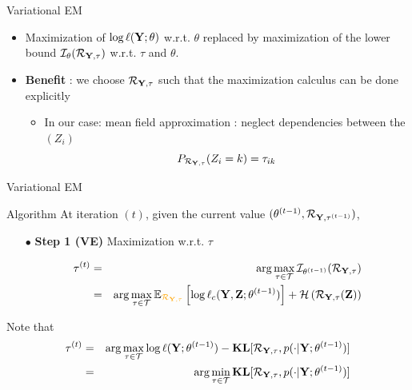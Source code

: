 \documentclass[compress,10pt]{beamer}
\begin{document}
 \begin{frame}{Variational EM }
 

\begin{itemize}
\item Maximization of  $\log \ell(\mathbf{Y} ; \theta)$  w.r.t.  $\theta$ replaced by maximization of the lower bound $\mathcal{I}_{\theta}(\mathcal{R}_{\mathbf{Y},\mathbf{\tau}}) $  w.r.t.  $\tau$ and $\theta$. 
\item \textbf{Benefit} : we choose   $\mathcal{R}_{\mathbf{Y},\mathbf{\tau}}$  such that the maximization calculus can be done explicitly
 \begin{itemize}
 \item In our case: mean field approximation : neglect dependencies between the  $(Z_i)$ 
 $$P_{\mathcal{R}_{\mathbf{Y},\mathbf{\tau}}}(Z_i=k) = \tau_{ik}$$
  \end{itemize}



 \end{itemize}
  \end{frame}
\begin{frame}{Variational  EM}

\begin{block}{Algorithm}
 \noindent At iteration $(t)$, given the current value  $(\theta^{(t-1)},\mathcal{R}_{\mathbf{Y}, \mathbf{\tau}^{(t-1)}})$,
\begin{enumerate}
\item[$\bullet$]\textbf{Step 1 (VE)} Maximization w.r.t. $\tau$

\begin{eqnarray*}
\btau^{(t)}  &=&  \arg \max_{\btau  \in \mathcal{T}}  \mathcal{I}_{\theta^{(t-1)}}(\mathcal{R}_{\Xall,\btau})\\
 &=&  \arg \max_{\btau  \in \mathcal{T}}   \mathbb{E}_{\color{dgreen}\mathcal{R}_{\Xall,\btau}} \left[\log \ell_c(\bX,\bZ;  \theta^{(t-1)})   \right] +  \mathcal{H}\left(\mathcal{R}_{\Xall,\btau}(\bZ)\right) 
 \end{eqnarray*}
 \end{enumerate}
 \end{block} 
 
Note that 
\begin{eqnarray*}
\mathbf{\tau}^{(t)}  &=&  \arg \max_{\mathbf{\tau}  \in \mathcal{T}}  \log \ell(\mathbf{Y} ; \theta^{(t-1)})  -  \mathbf{KL}[\mathcal{R}_{\mathbf{Y}, \mathbf{\tau}}, p(\cdot | \mathbf{Y}; \theta^{(t-1)})]\\ 
&=& \arg \min_{\mathbf{\tau}  \in \mathcal{T}}\mathbf{KL}[\mathcal{R}_{\mathbf{Y}, \mathbf{\tau}}, p(\cdot | \mathbf{Y}; \theta^{(t-1)})] 
 \end{eqnarray*}
 \end{frame}
\end{document}
